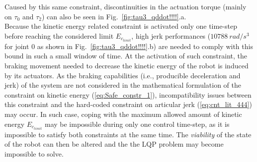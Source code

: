 Caused by this same constraint, discontinuities in the actuation torque (mainly on $\tau_0$ and $\tau_2$) can also be seen in Fig.~\ref{fig:tau3_qddot!!!!}.a. \\
Because the kinetic energy related constraint is activated only one time-step before reaching the considered limit $E_{c_{limit}}$, high jerk performances ($10788~rad/s^3$ for joint $0$ as shown in Fig.~\ref{fig:tau3_qddot!!!!}.b) are needed to comply with this bound in such a small window of time. At the activation of such constraint, the braking movement needed to decrease the kinetic energy of the robot is induced by its actuators. As the braking capabilities (i.e., producible deceleration and jerk) of the system are not considered in the mathematical formulation of the constraint on kinetic energy (\ref{eq:Safe_constr_1}), incompatibility issues between this constraint and the hard-coded constraint on articular jerk (\ref{eq:cnt_lit_444}) may occur. In such case, coping with the maximum allowed amount of kinetic energy $E_{c_{limit}}$ may be impossible during only one control time-step, as it is  impossible to satisfy both constraints at the same time. The \textit{viability} of the state of the robot can then  be altered and the the LQP problem may become impossible to solve.
